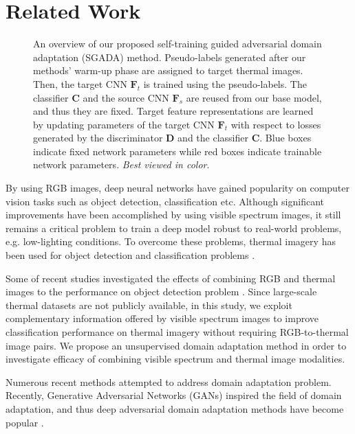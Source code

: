 \documentclass[final]{cvpr}
\begin{document}
\section{Related Work}

\begin{figure*}[ht]
\centering
    \vspace{3mm}
    \caption{An overview of our proposed self-training guided adversarial domain adaptation (SGADA) method. Pseudo-labels generated after our methods' warm-up phase are assigned to target thermal images. Then, the target CNN $ \mathbf{F}_t $ is trained using the pseudo-labels. The classifier $ \mathbf{C} $ and the source CNN $ \mathbf{F}_s $ are reused from our base model, and thus they are fixed. Target feature representations are learned by updating parameters of the target CNN $ \mathbf{F}_t $ with respect to losses generated by the discriminator $ \mathbf{D} $ and the classifier $ \mathbf{C} $. Blue boxes indicate fixed network parameters while red boxes indicate trainable network parameters. \textit{Best viewed in color}.}
    \label{fig:overview}
\end{figure*}

By using RGB images, deep neural networks have gained popularity on computer vision tasks such as object detection, classification etc. Although significant improvements have been accomplished by using visible spectrum images, it still remains a critical problem to train a deep model robust to real-world problems, e.g. low-lighting conditions. To overcome these problems, thermal imagery has been used for object detection and classification problems \cite{guo2019domain, kaist, saponaro2015material}.

Some of recent studies investigated the effects of combining RGB and thermal images to the performance on object detection problem \cite{devaguptapu2019borrow, guo2019domain, kaist, BMVC2016_73}. Since large-scale thermal datasets are not publicly available, in this study, we exploit complementary information offered by visible spectrum images to improve classification performance on thermal imagery without requiring RGB-to-thermal image pairs. We propose an unsupervised domain adaptation method in order to investigate efficacy of combining visible spectrum and thermal image modalities. 

Numerous recent methods attempted to address domain adaptation problem. Recently, Generative Adversarial Networks (GANs) \cite{gan} inspired the field of domain adaptation, and thus deep adversarial domain adaptation methods have become popular \cite{pixelda, dann, tat, cdan, adda}.
\end{document}
